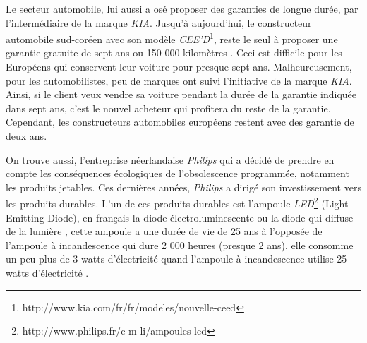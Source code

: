\bigbreak
Le secteur automobile, lui aussi a osé proposer des garanties de longue durée, par l'intermédiaire de la marque \textit{KIA}. Jusqu'à aujourd'hui, le constructeur automobile sud-coréen avec son modèle \textit{CEE'D}\footnote{http://www.kia.com/fr/fr/modeles/nouvelle-ceed}, reste le seul à proposer une garantie gratuite de sept ans ou 150 000 kilomètres \cite{kia}. Ceci est difficile pour les Européens qui conservent leur voiture pour presque sept ans. Malheureusement, pour les automobilistes, peu de marques ont suivi l’initiative de la marque \textit{KIA}. Ainsi, si le client veux vendre sa voiture pendant la durée de la garantie indiquée dans sept ans, c'est le nouvel acheteur qui profitera du reste de la garantie. Cependant, les constructeurs automobiles européens restent avec des garantie de deux ans.

\bigbreak
On trouve aussi, l'entreprise néerlandaise \textit{Philips} qui a décidé de prendre en compte les conséquences écologiques de l'obsolescence programmée, notamment les produits jetables. Ces dernières années, \textit{Philips} a dirigé son investissement vers  les produits durables. L'un de ces produits durables est l'ampoule \textit{LED}\footnote{http://www.philips.fr/c-m-li/ampoules-led} (Light Emitting Diode), en français la diode électroluminescente ou la diode qui  diffuse de la lumière , cette ampoule a une durée de vie de 25 ans à l'opposée de l'ampoule à incandescence qui dure 2 000 heures (presque 2 ans), elle consomme un peu plus de 3 watts d’électricité quand l'ampoule à incandescence utilise 25 watts d’électricité \cite{ampoule_inc}. 


